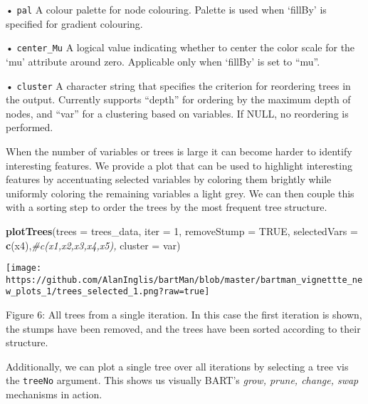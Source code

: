 \documentclass[
]{article}
\newenvironment{Shaded}{\begin{snugshade}}{\end{snugshade}}
\newcommand{\AttributeTok}[1]{\textcolor[rgb]{0.13,0.29,0.53}{#1}}
\newcommand{\CommentTok}[1]{\textcolor[rgb]{0.56,0.35,0.01}{\textit{#1}}}
\newcommand{\ConstantTok}[1]{\textcolor[rgb]{0.56,0.35,0.01}{#1}}
\newcommand{\DecValTok}[1]{\textcolor[rgb]{0.00,0.00,0.81}{#1}}
\newcommand{\FunctionTok}[1]{\textcolor[rgb]{0.13,0.29,0.53}{\textbf{#1}}}
\newcommand{\NormalTok}[1]{#1}
\newcommand{\StringTok}[1]{\textcolor[rgb]{0.31,0.60,0.02}{#1}}
\begin{document}
• \texttt{pal} A colour palette for node colouring. Palette is used when
`fillBy' is specified for gradient colouring.

• \texttt{center\_Mu} A logical value indicating whether to center the
color scale for the `mu' attribute around zero. Applicable only when
`fillBy' is set to ``mu''.

• \texttt{cluster} A character string that specifies the criterion for
reordering trees in the output. Currently supports ``depth'' for
ordering by the maximum depth of nodes, and ``var'' for a clustering
based on variables. If NULL, no reordering is performed.

When the number of variables or trees is large it can become harder to
identify interesting features. We provide a plot that can be used to
highlight interesting features by accentuating selected variables by
coloring them brightly while uniformly coloring the remaining variables
a light grey. We can then couple this with a sorting step to order the
trees by the most frequent tree structure.

\begin{Shaded}
\begin{Highlighting}[]
\FunctionTok{plotTrees}\NormalTok{(}\AttributeTok{trees =}\NormalTok{ trees\_data,}
          \AttributeTok{iter =} \DecValTok{1}\NormalTok{,}
          \AttributeTok{removeStump =} \ConstantTok{TRUE}\NormalTok{,}
          \AttributeTok{selectedVars =} \FunctionTok{c}\NormalTok{(}\StringTok{\textquotesingle{}x4\textquotesingle{}}\NormalTok{),}\CommentTok{\#c(\textquotesingle{}x1\textquotesingle{},\textquotesingle{}x2\textquotesingle{},\textquotesingle{}x3\textquotesingle{},\textquotesingle{}x4\textquotesingle{},\textquotesingle{}x5\textquotesingle{}),}
          \AttributeTok{cluster =} \StringTok{\textquotesingle{}var\textquotesingle{}}\NormalTok{)}
\end{Highlighting}
\end{Shaded}

\begin{center}\texttt{[image: https://github.com/AlanInglis/bartMan/blob/master/bartman\_vignettte\_new\_plots\_1/trees\_selected\_1.png?raw=true]} \end{center}

\protect\hypertarget{fig6:fig6}{}{Figure 6: }All trees from a single
iteration. In this case the first iteration is shown, the stumps have
been removed, and the trees have been sorted according to their
structure.

Additionally, we can plot a single tree over all iterations by selecting
a tree vis the \texttt{treeNo} argument. This shows us visually BART's
\emph{grow, prune, change, swap} mechanisms in action.
\end{document}
